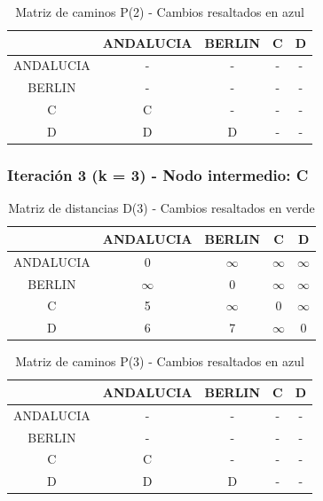 \documentclass[12pt]{article}
\begin{document}
\begin{table}[h!]
\centering
\begin{tabular}{|c|c|c|c|c|}
\hline
 & ANDALUCIA & BERLIN & C & D \\\hline
ANDALUCIA & - & - & - & - \\\hline
BERLIN & - & - & - & - \\\hline
C & C & - & - & - \\\hline
D & D & D & - & - \\\hline
\end{tabular}
\caption{Matriz de caminos P(2) - Cambios resaltados en azul}
\end{table}

\subsubsection{Iteración 3 (k = 3) - Nodo intermedio: C}
\begin{table}[h!]
\centering
\begin{tabular}{|c|c|c|c|c|}
\hline
 & ANDALUCIA & BERLIN & C & D \\\hline
ANDALUCIA & 0 & $\infty$ & $\infty$ & $\infty$ \\\hline
BERLIN & $\infty$ & 0 & $\infty$ & $\infty$ \\\hline
C & 5 & $\infty$ & 0 & $\infty$ \\\hline
D & 6 & 7 & $\infty$ & 0 \\\hline
\end{tabular}
\caption{Matriz de distancias D(3) - Cambios resaltados en verde}
\end{table}

\begin{table}[h!]
\centering
\begin{tabular}{|c|c|c|c|c|}
\hline
 & ANDALUCIA & BERLIN & C & D \\\hline
ANDALUCIA & - & - & - & - \\\hline
BERLIN & - & - & - & - \\\hline
C & C & - & - & - \\\hline
D & D & D & - & - \\\hline
\end{tabular}
\caption{Matriz de caminos P(3) - Cambios resaltados en azul}
\end{table}
\end{document}
